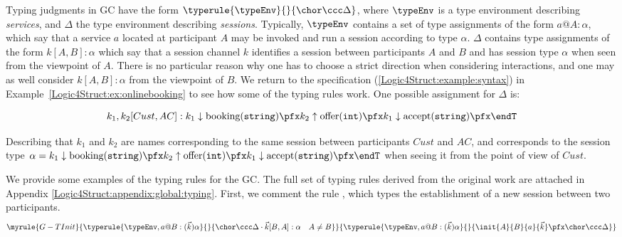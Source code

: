 Typing judgments in GC have the form $\typerule{\typeEnv}{}{\chor \ccc
  \Delta}$, where $\typeEnv$ is a type environment describing
\emph{services},  and $\Delta$  the type environment describing 
\emph{sessions}. Typically, $\typeEnv$
contains a set of type assignments of the form $a@A: \alpha$, which
say that a service $a$ located at participant $A$ may be invoked and
run a session according to type $\alpha$. $\Delta$ contains type
assignments of the form $k[A,B]: \alpha$ which say that a session
channel $k$ identifies a session between participants $A$ and $B$ and
has session type $\alpha$ when seen from the viewpoint of
$A$. There is no particular reason why one has to choose a
  strict direction when considering interactions, and one may as well
  consider $k[A,B]: \alpha$ from the viewpoint of $B$. We return to
the specification (\ref{Logic4Struct:example:syntax}) in
Example~\ref{Logic4Struct:ex:onlinebooking}
  to see how some of the typing rules work.  One possible assignment
  for $\Delta$ is:

 \begin{equation*}
       k_1, k_2 [Cust, AC]: k_1 \downarrow
       \text{booking}(\mathtt{string}) \pfx k_2 \uparrow
       \text{offer}(\mathtt{int}) \pfx k_1 \downarrow \text{accept}(\mathtt{string}) \pfx \endT 
\end{equation*}

Describing that $k_1$ and $k_2$ are names corresponding to the same
session between participants $Cust$ and $AC$, and corresponds to the
session type $\alpha = k_1 \downarrow
       \text{booking}(\mathtt{string}) \pfx k_2 \uparrow
       \text{offer}(\mathtt{int}) \pfx k_1 \downarrow
       \text{accept}(\mathtt{string}) \pfx \endT $ when seeing it from the
       point of view of $Cust$.



We provide some examples of the typing rules for the GC.
The full set of
typing rules derived from the original work are attached in Appendix
\ref{Logic4Struct:appendix:global:typing}.
First, we comment the rule , which types the establishment of a
new session between two participants. 
\begin{align*}
\myrule{    G-TInit}
    { \typerule{\typeEnv, a@B : (\vec{k})\alpha  }{}{
        \chor  \ccc \Delta \cdot \vec{k}[B,A]: \alpha \quad A \neq B} } { \typerule{\typeEnv, a@B : (\vec{k})\alpha  }{}{
        \init{A}{B}{a}{\vec{k}}\pfx \chor  \ccc \Delta}}
\end{align*} 

